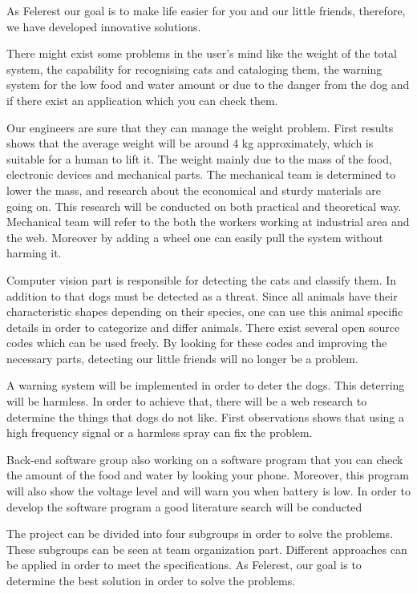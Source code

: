 
As Felerest our goal is to make life easier for you and our little friends, therefore, we have developed innovative solutions. 

There might exist some problems in the user's mind like the weight of the total system, the capability for recognising cats and cataloging them, the warning system for the low food and water amount or due to the danger from the dog and if there exist an application which you can check them. 

Our engineers are sure that they can manage the weight problem. First results shows that the average weight will be around 4 kg approximately, which is suitable for a human to lift it. The weight mainly due to the mass of the food, electronic devices and mechanical parts. The mechanical team is determined to lower the mass, and research about the economical and sturdy materials are going on. This research will be conducted on both practical and theoretical way. Mechanical team will refer to the both the workers working at industrial area and the web. Moreover by adding a wheel one can easily pull the system without harming it.

Computer vision part is responsible for detecting the cats and classify them. In addition to that dogs must be detected as a threat. Since all animals have their characteristic shapes depending on their species, one can use this animal specific details in order to categorize and differ animals. There exist several open source codes which can be used freely. By looking for these codes and improving the necessary parts, detecting our little friends will no longer be a problem.

A warning system will be implemented in order to deter the dogs. This deterring will be harmless. In order to achieve that, there will be a web research to determine the things that dogs do not like. First observations shows that using a high frequency signal\cite{cite:Dogrepellingdetterent} or a harmless spray\cite{cite:Dogrepellingsprey} can fix the problem. 

Back-end software group also working on a software program that you can check the amount of the food and water by looking your phone. Moreover, this program will also show the voltage level and will warn you when battery is low. In order to develop the software program a good literature search will be conducted 

The project can be divided into four subgroups in order to solve the problems. These subgroups can be seen at team organization part. Different approaches can be applied in order to meet the specifications. As Felerest, our goal is to determine the best solution in order to solve the problems.
